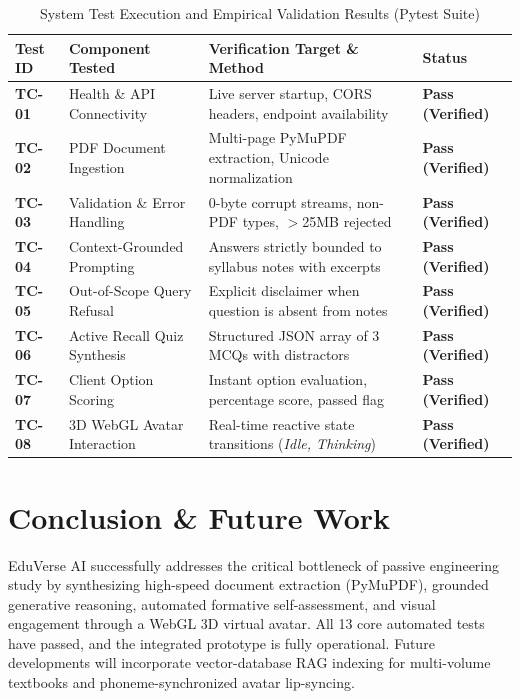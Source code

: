 \documentclass[10pt,a4paper]{article}
\begin{document}
\begin{table}[H]
\centering
\footnotesize
\renewcommand{\arraystretch}{1.08}
\begin{tabularx}{\textwidth}{l p{3.8cm} X l}
\toprule
\textbf{Test ID} & \textbf{Component Tested} & \textbf{Verification Target \& Method} & \textbf{Status} \\
\midrule
\textbf{TC-01} & Health \& API Connectivity & Live server startup, CORS headers, endpoint availability & \textbf{Pass (Verified)} \\
\textbf{TC-02} & PDF Document Ingestion & Multi-page PyMuPDF extraction, Unicode normalization & \textbf{Pass (Verified)} \\
\textbf{TC-03} & Validation \& Error Handling & 0-byte corrupt streams, non-PDF types, $>$25MB rejected & \textbf{Pass (Verified)} \\
\textbf{TC-04} & Context-Grounded Prompting & Answers strictly bounded to syllabus notes with excerpts & \textbf{Pass (Verified)} \\
\textbf{TC-05} & Out-of-Scope Query Refusal & Explicit disclaimer when question is absent from notes & \textbf{Pass (Verified)} \\
\textbf{TC-06} & Active Recall Quiz Synthesis & Structured JSON array of 3 MCQs with distractors & \textbf{Pass (Verified)} \\
\textbf{TC-07} & Client Option Scoring & Instant option evaluation, percentage score, passed flag & \textbf{Pass (Verified)} \\
\textbf{TC-08} & 3D WebGL Avatar Interaction & Real-time reactive state transitions (\textit{Idle, Thinking}) & \textbf{Pass (Verified)} \\
\bottomrule
\end{tabularx}
\caption{System Test Execution and Empirical Validation Results (Pytest Suite)}
\label{tab:two_page_tests}
\end{table}

\section{Conclusion \& Future Work}
EduVerse AI successfully addresses the critical bottleneck of passive engineering study by synthesizing high-speed document extraction (PyMuPDF), grounded generative reasoning, automated formative self-assessment, and visual engagement through a WebGL 3D virtual avatar. All 13 core automated tests have passed, and the integrated prototype is fully operational. Future developments will incorporate vector-database RAG indexing for multi-volume textbooks and phoneme-synchronized avatar lip-syncing.
\end{document}
